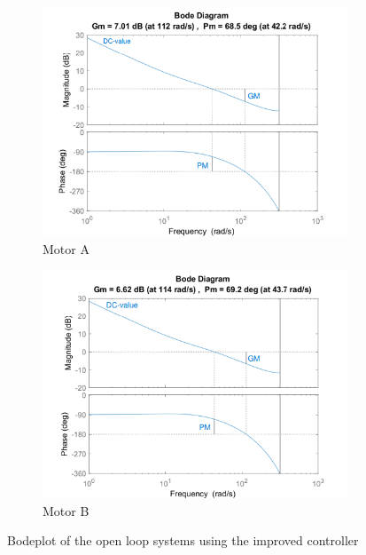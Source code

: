 \documentclass[a4paper,kul]{kulakarticle} %
\begin{document}
\begin{figure}[htp!]
	\centering
	\begin{subfigure}[b]{0.49\textwidth}
		\centering
		\includegraphics[width=\linewidth]{bodeplot_contr_sysA_openloop_method2.png}
		\caption{Motor A}
	\end{subfigure}
	\hfill
	\begin{subfigure}[b]{0.49\textwidth}  
		\centering
		\includegraphics[width=\linewidth]{bodeplot_contr_sysB_openloop_method2.png}
		\caption{Motor B}
	\end{subfigure}
	\caption{Bodeplot of the open loop systems using the improved controller}
	\label{fig:bodeplotopenloopmethod2}
\end{figure}
\end{document}
